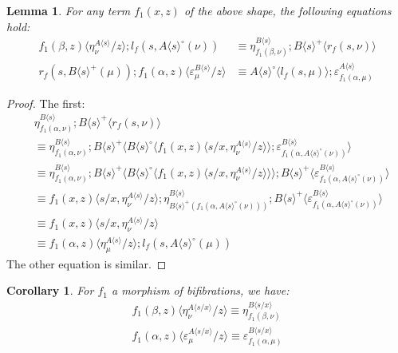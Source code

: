 \documentclass[10pt]{article}
\newtheorem{lemma}{Lemma}
\newtheorem{corollary}{Corollary}
\theoremstyle{definition}
\newcommand\TrPlus[2]{\ensuremath{{#1}^+(#2)}}
\newcommand\TrCirc[2]{\ensuremath{{#1}^\circ(#2)}}
\newcommand\ap[2]{\ensuremath{#1 \langle #2 \rangle }}
\newcommand\ApPlus[2]{\ensuremath{{#1}^+ \langle #2 \rangle }}
\newcommand\ApCirc[2]{\ensuremath{{#1}^\circ \langle #2 \rangle }}
\begin{document}
\begin{lemma}
For \emph{any} term $f_1(x,z)$ of the above shape, the following equations hold:
\begin{align*}
\ap{f_1(\beta,z)}{\eta^{\ap{A}{s}}_\nu/z} ; l_f(s, \TrCirc{\ap{A}{s}}{\nu}) &\equiv \eta^{\ap{B}{s}}_{f_1(\beta, \nu)} ; \ApPlus{\ap{B}{s}}{r_f(s, \nu)} \\
r_f(s, \TrPlus{\ap{B}{s}}{\mu}) ; \ap{f_1(\alpha,z)}{\varepsilon^{\ap{B}{s}}_\mu/z} &\equiv \ApCirc{\ap{A}{s}}{l_f(s,\mu)};\varepsilon^{\ap{A}{s}}_{f_1(\alpha, \mu)}
\end{align*}
\end{lemma}
\begin{proof}
The first:
\begin{align*}
&\eta^{\ap{B}{s}}_{f_1(\alpha, \nu)} ; \ApPlus{\ap{B}{s}}{r_f(s, \nu)} \\
&\equiv \eta^{\ap{B}{s}}_{f_1(\alpha, \nu)} ; \ApPlus{\ap{B}{s}}{\ApCirc{\ap{B}{s}}{\ap{f_1(x,z)}{s/x, \eta^{\ap{A}{s}}_{\nu}/z}};\varepsilon^{\ap{B}{s}}_{f_1(\alpha,\TrCirc{\ap{A}{s}}{\nu})}} \\
&\equiv \eta^{\ap{B}{s}}_{f_1(\alpha, \nu)} ; \ApPlus{\ap{B}{s}}{\ApCirc{\ap{B}{s}}{\ap{f_1(x,z)}{s/x, \eta^{\ap{A}{s}}_{\nu}/z}}};\ApPlus{\ap{B}{s}}{\varepsilon^{\ap{B}{s}}_{f_1(\alpha,\TrCirc{\ap{A}{s}}{\nu})}} \\
&\equiv \ap{f_1(x,z)}{s/x, \eta^{\ap{A}{s}}_{\nu}/z} ; \eta^{\ap{B}{s}}_{\TrPlus{\ap{B}{s}}{f_1(\alpha,\TrCirc{\ap{A}{s}}{\nu})}} ; \ApPlus{\ap{B}{s}}{\varepsilon^{\ap{B}{s}}_{f_1(\alpha,\TrCirc{\ap{A}{s}}{\nu})}} \\
&\equiv \ap{f_1(x,z)}{s/x, \eta^{\ap{A}{s}}_{\nu}/z} \\
&\equiv \ap{f_1(\alpha,z)}{\eta^{\ap{A}{s}}_\mu/z} ; l_f(s, \TrCirc{\ap{A}{s}}{\mu})
\end{align*}
The other equation is similar.
\end{proof}

\begin{corollary}
For $f_1$ a morphism of bifibrations, we have:
\begin{align}
\label{mor-fib-unit}
\ap{f_1(\beta,z)}{\eta^{\ap{A}{s/x}}_\nu/z} \equiv \eta^{{\ap{B}{s/x}}}_{f_1(\beta,\nu)} \\
\label{mor-fib-counit}
\ap{f_1(\alpha,z)}{\varepsilon^{\ap{A}{s/x}}_\mu/z} \equiv
\varepsilon^{{\ap{B}{s/x}}}_{f_1(\alpha,\mu)}
\end{align}
\end{corollary}
\end{document}
